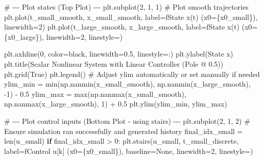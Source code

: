 \documentclass[
  letterpaper,
  DIV=11,
  numbers=noendperiod,
  oneside]{scrartcl}
\newenvironment{Shaded}{\begin{snugshade}}{\end{snugshade}}
\newcommand{\BuiltInTok}[1]{\textcolor[rgb]{0.00,0.23,0.31}{#1}}
\newcommand{\CommentTok}[1]{\textcolor[rgb]{0.37,0.37,0.37}{#1}}
\newcommand{\ControlFlowTok}[1]{\textcolor[rgb]{0.00,0.23,0.31}{\textbf{#1}}}
\newcommand{\DecValTok}[1]{\textcolor[rgb]{0.68,0.00,0.00}{#1}}
\newcommand{\FloatTok}[1]{\textcolor[rgb]{0.68,0.00,0.00}{#1}}
\newcommand{\NormalTok}[1]{\textcolor[rgb]{0.00,0.23,0.31}{#1}}
\newcommand{\OperatorTok}[1]{\textcolor[rgb]{0.37,0.37,0.37}{#1}}
\newcommand{\SpecialCharTok}[1]{\textcolor[rgb]{0.37,0.37,0.37}{#1}}
\newcommand{\SpecialStringTok}[1]{\textcolor[rgb]{0.13,0.47,0.30}{#1}}
\newcommand{\StringTok}[1]{\textcolor[rgb]{0.13,0.47,0.30}{#1}}
\newcommand{\VariableTok}[1]{\textcolor[rgb]{0.07,0.07,0.07}{#1}}
\begin{document}
\begin{Shaded}
\begin{Highlighting}[numbers=left,,]
\CommentTok{\# {-}{-}{-} Plot states (Top Plot) {-}{-}{-}}
\NormalTok{plt.subplot(}\DecValTok{2}\NormalTok{, }\DecValTok{1}\NormalTok{, }\DecValTok{1}\NormalTok{)}
\CommentTok{\# Plot smooth trajectories}
\NormalTok{plt.plot(t\_small\_smooth, x\_small\_smooth,}
\NormalTok{         label}\OperatorTok{=}\SpecialStringTok{f\textquotesingle{}State x(t) (x0=}\SpecialCharTok{\{}\NormalTok{x0\_small}\SpecialCharTok{\}}\SpecialStringTok{)\textquotesingle{}}\NormalTok{, linewidth}\OperatorTok{=}\DecValTok{2}\NormalTok{)}
\NormalTok{plt.plot(t\_large\_smooth, x\_large\_smooth,}
\NormalTok{         label}\OperatorTok{=}\SpecialStringTok{f\textquotesingle{}State x(t) (x0=}\SpecialCharTok{\{}\NormalTok{x0\_large}\SpecialCharTok{\}}\SpecialStringTok{)\textquotesingle{}}\NormalTok{, linewidth}\OperatorTok{=}\DecValTok{2}\NormalTok{, linestyle}\OperatorTok{=}\StringTok{\textquotesingle{}{-}{-}\textquotesingle{}}\NormalTok{)}

\NormalTok{plt.axhline(}\DecValTok{0}\NormalTok{, color}\OperatorTok{=}\StringTok{\textquotesingle{}black\textquotesingle{}}\NormalTok{, linewidth}\OperatorTok{=}\FloatTok{0.5}\NormalTok{, linestyle}\OperatorTok{=}\StringTok{\textquotesingle{}:\textquotesingle{}}\NormalTok{)}
\NormalTok{plt.ylabel(}\StringTok{\textquotesingle{}State x\textquotesingle{}}\NormalTok{)}
\NormalTok{plt.title(}\StringTok{\textquotesingle{}Scalar Nonlinear System with Linear Controller (Pole @ 0.5)\textquotesingle{}}\NormalTok{)}
\NormalTok{plt.grid(}\VariableTok{True}\NormalTok{)}
\NormalTok{plt.legend()}
\CommentTok{\# Adjust ylim automatically or set manually if needed}
\NormalTok{ylim\_min }\OperatorTok{=} \BuiltInTok{min}\NormalTok{(np.nanmin(x\_small\_smooth), np.nanmin(x\_large\_smooth), }\OperatorTok{{-}}\DecValTok{1}\NormalTok{) }\OperatorTok{{-}} \FloatTok{0.5}
\NormalTok{ylim\_max }\OperatorTok{=} \BuiltInTok{max}\NormalTok{(np.nanmax(x\_small\_smooth), np.nanmax(x\_large\_smooth), }\DecValTok{1}\NormalTok{) }\OperatorTok{+} \FloatTok{0.5}
\NormalTok{plt.ylim(ylim\_min, ylim\_max)}

\CommentTok{\# {-}{-}{-} Plot control inputs (Bottom Plot {-} using stairs) {-}{-}{-}}
\NormalTok{plt.subplot(}\DecValTok{2}\NormalTok{, }\DecValTok{1}\NormalTok{, }\DecValTok{2}\NormalTok{)}
\CommentTok{\# Ensure simulation ran successfully and generated history}
\NormalTok{final\_idx\_small }\OperatorTok{=} \BuiltInTok{len}\NormalTok{(u\_small)}
\ControlFlowTok{if}\NormalTok{ final\_idx\_small }\OperatorTok{\textgreater{}} \DecValTok{0}\NormalTok{:}
\NormalTok{    plt.stairs(u\_small, t\_small\_discrete, label}\OperatorTok{=}\SpecialStringTok{f\textquotesingle{}Control u[k] (x0=}\SpecialCharTok{\{}\NormalTok{x0\_small}\SpecialCharTok{\}}\SpecialStringTok{)\textquotesingle{}}\NormalTok{,}
\NormalTok{               baseline}\OperatorTok{=}\VariableTok{None}\NormalTok{, linewidth}\OperatorTok{=}\DecValTok{2}\NormalTok{, linestyle}\OperatorTok{=}\StringTok{\textquotesingle{}{-}{-}\textquotesingle{}}\NormalTok{)}


\end{Highlighting}
\end{Shaded}
\end{document}
